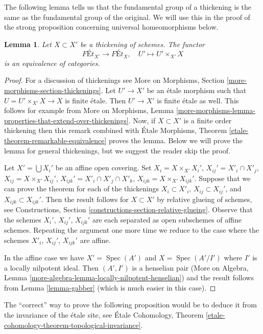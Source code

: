 \documentclass{stacks-project}
\theoremstyle{plain}
\newtheorem{lemma}[subsection]{Lemma}
\theoremstyle{definition}
\theoremstyle{remark}
\numberwithin{equation}{subsection}
\def\Spec{\mathop{\mathrm{Spec}}}
\begin{document}
\noindent
The following lemma tells us that the fundamental group of a thickening
is the same as the fundamental group of the original. We will use this
in the proof of the strong proposition concerning universal homeomorphisms
below.

\begin{lemma}
\label{lemma-thickening}
Let $X \subset X'$ be a thickening of schemes. The functor
$$
\textit{F\'Et}_{X'} \longrightarrow \textit{F\'Et}_X,\quad
U' \longmapsto U' \times_{X'} X
$$
is an equivalence of categories.
\end{lemma}

\begin{proof}
For a discussion of thickenings see
More on Morphisms, Section \ref{more-morphisms-section-thickenings}.
Let $U' \to X'$ be an \'etale morphism such that $U = U' \times_{X'} X \to X$
is finite \'etale. Then $U' \to X'$ is finite \'etale as well.
This follows for example from More on Morphisms, Lemma
\ref{more-morphisms-lemma-properties-that-extend-over-thickenings}.
Now, if $X \subset X'$ is a finite order thickening then this remark
combined with \'Etale Morphisms, Theorem
\ref{etale-theorem-remarkable-equivalence}
proves the lemma. Below we will prove the lemma for general thickenings, but
we suggest the reader skip the proof.

\medskip\noindent
Let $X' = \bigcup X_i'$ be an affine open covering. Set
$X_i = X \times_{X'} X_i'$, $X_{ij}' = X'_i \cap X'_j$,
$X_{ij} = X \times_{X'} X_{ij}'$, $X_{ijk}' = X'_i \cap X'_j \cap X'_k$,
$X_{ijk} = X \times_{X'} X_{ijk}'$.
Suppose that we can prove
the theorem for each of the thickenings
$X_i \subset X'_i$, $X_{ij} \subset X_{ij}'$, and $X_{ijk} \subset X_{ijk}'$.
Then the result follows for $X \subset X'$ by relative glueing of
schemes, see
Constructions, Section \ref{constructions-section-relative-glueing}.
Observe that the schemes $X_i'$, $X_{ij}'$, $X_{ijk}'$ are
each separated as open subschemes of affine schemes. Repeating the
argument one more time we reduce to the case where the schemes
$X'_i$, $X_{ij}'$, $X_{ijk}'$ are affine.

\medskip\noindent
In the affine case we have $X' = \Spec(A')$ and $X = \Spec(A'/I')$
where $I'$ is a locally nilpotent ideal. Then $(A', I')$ is a
henselian pair (More on Algebra, Lemma
\ref{more-algebra-lemma-locally-nilpotent-henselian})
and the result follows from Lemma \ref{lemma-gabber} (which is
much easier in this case).
\end{proof}

\noindent
The ``correct'' way to prove the following proposition would be to
deduce it from the invariance of the \'etale site, see
\'Etale Cohomology, Theorem
\ref{etale-cohomology-theorem-topological-invariance}.
\end{document}

